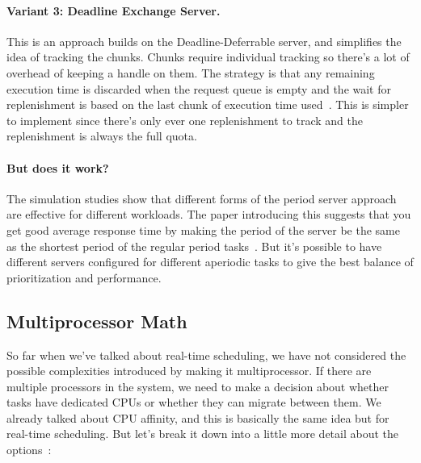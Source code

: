 \paragraph{Variant 3: Deadline Exchange Server.}
This is an approach builds on the Deadline-Deferrable server, and simplifies the idea of tracking the chunks. Chunks require individual tracking so there's a lot of overhead of keeping a handle on them. The strategy is that any remaining execution time is discarded when the request queue is empty and the wait for replenishment is based on the last chunk of execution time used~\cite{aperiodic-server}. This is simpler to implement since there's only ever one replenishment to track and the replenishment is always the full quota. 

\paragraph{But does it work?}
The simulation studies show that different forms of the period server approach are effective for different workloads. The paper introducing this suggests that you get good average response time by making the period of the server be the same as the shortest period of the regular period tasks~\cite{aperiodic-server}. But it's possible to have different servers configured for different aperiodic tasks to give the best balance of prioritization and performance.

\subsection*{Multiprocessor Math}

So far when we've talked about real-time scheduling, we have not considered the possible complexities introduced by making it multiprocessor. If there are multiple processors in the system, we need to make a decision about whether tasks have dedicated CPUs or whether they can migrate between them. We already talked about CPU affinity, and this is basically the same idea but for real-time scheduling. But let's break it down into a little more detail about the options~\cite{sa-rt}:







